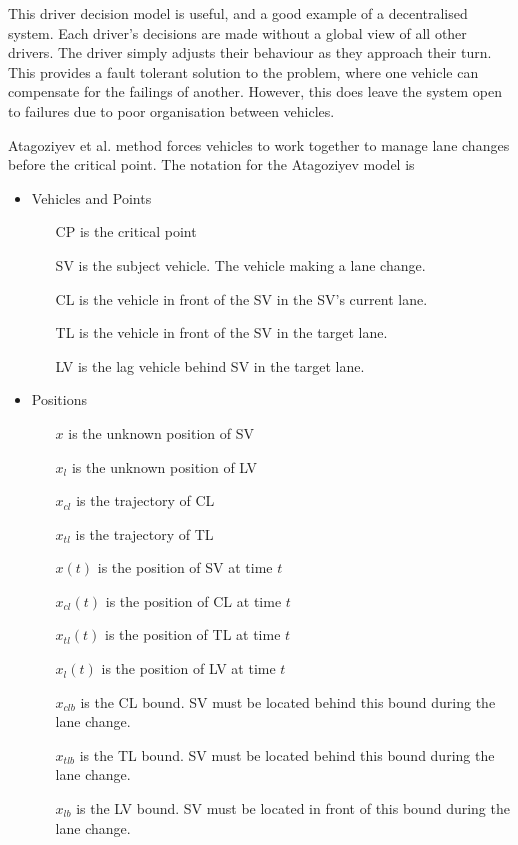 This driver decision model is useful, and a good example of a decentralised system. Each driver's decisions are made without a global view of all other drivers. The driver simply adjusts their behaviour as they approach their turn. This provides a fault tolerant solution to the problem, where one vehicle can compensate for the failings of another. However, this does leave the system open to failures due to poor organisation between vehicles. 

Atagoziyev et al. method forces vehicles to work together to manage lane changes before the critical point. The notation for the Atagoziyev model is

\begin{itemize}
\item Vehicles and Points
\begin{itemize}
\item[CP] is the critical point
\item[SV] is the subject vehicle. The vehicle making a lane change.
\item[CL] is the vehicle in front of the SV in the SV's current lane.
\item[TL] is the vehicle in front of the SV in the target lane.
\item[LV] is the lag vehicle behind SV in the target lane.
\end{itemize}
\item Positions
\begin{itemize}
\item[$x$] is the unknown position of SV
\item[$x_l$] is the unknown position of LV
\item[$x_{cl}$] is the trajectory of CL
\item[$x_{tl}$] is the trajectory of TL
\item[$x(t)$] is the position of SV at time $t$
\item[$x_{cl}(t)$] is the position of CL at time $t$
\item[$x_{tl}(t)$] is the position of TL at time $t$
\item[$x_l(t)$] is the position of LV at time $t$
\item[$x_{clb}$] is the CL bound. SV must be located behind this bound during the lane change.
\item[$x_{tlb}$] is the TL bound. SV must be located behind this bound during the lane change.
\item[$x_{lb}$] is the LV bound. SV must be located in front of this bound during the lane change.

\end{itemize}
\end{itemize}
